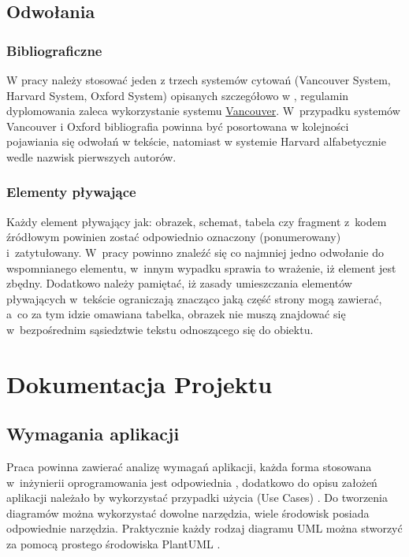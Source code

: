 \documentclass[12pt,a4paper]{article}
\begin{document}
\subsection{Odwołania}

\subsubsection{Bibliograficzne}
W pracy należy stosować jeden z trzech systemów cytowań (Vancouver System, Harvard System, Oxford System) opisanych szczegółowo w \cite{Cytowanie}, regulamin dyplomowania zaleca wykorzystanie systemu \underline{Vancouver}. W~przypadku systemów Vancouver i Oxford bibliografia powinna być posortowana w kolejności pojawiania się odwołań w tekście, natomiast w systemie Harvard alfabetycznie wedle nazwisk pierwszych autorów.

\subsubsection{Elementy pływające}
Każdy element pływający jak: obrazek, schemat, tabela czy fragment z~kodem źródłowym powinien zostać odpowiednio oznaczony (ponumerowany) i~zatytułowany. W~pracy powinno znaleźć się co najmniej jedno odwołanie do wspomnianego elementu, w~innym wypadku sprawia to wrażenie, iż element jest zbędny. Dodatkowo należy pamiętać, iż zasady umieszczania elementów pływających w~tekście ograniczają znacząco jaką część strony mogą zawierać, a~co za tym idzie omawiana tabelka, obrazek nie muszą znajdować się w~bezpośrednim sąsiedztwie tekstu odnoszącego się do obiektu.

\section{Dokumentacja Projektu}\label{dokumentacja}

\subsection{Wymagania aplikacji}
Praca powinna zawierać analizę wymagań aplikacji, każda forma stosowana w~inżynierii oprogramowania jest odpowiednia \cite{IO}, dodatkowo do opisu założeń aplikacji należało by wykorzystać przypadki użycia (Use Cases) \cite{UML}. Do tworzenia diagramów można wykorzystać dowolne narzędzia, wiele środowisk posiada odpowiednie narzędzia. Praktycznie każdy rodzaj diagramu UML można stworzyć za pomocą  prostego środowiska PlantUML \cite{plantUML}.
\end{document}
